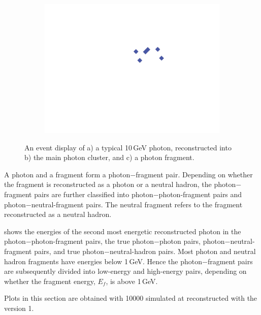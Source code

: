 \begin{figure}[tbph]
\begin{subfigure}[c]{0.3\textwidth}
    \includegraphics[width=\textwidth]{photon/small2}
    \caption{}
    \label{fig:photonEvtDspPhotonFragSmall}
  \end{subfigure}
\caption
{An event display of a) a typical 10\,GeV photon, reconstructed into  b) the main photon cluster,  and c) a photon fragment. }
\label{fig:photonEvtDspPhotonFrag}
\end{figure}




A photon and a fragment form a photon$-$fragment pair.  Depending on whether the fragment is reconstructed as a photon or a neutral hadron, the photon$-$fragment pairs are further classified into photon$-$photon-fragment pairs and photon$-$neutral-fragment pairs. The neutral fragment refers to the fragment reconstructed as a neutral hadron.

 shows the energies of the second most energetic reconstructed photon in the photon$-$photon-fragment pairs, the true photon$-$photon pairs, photon$-$neutral-fragment pairs, and true photon$-$neutral-hadron pairs. Most photon and neutral hadron fragments have energies below 1\,GeV. Hence the photon$-$fragment pairs are subsequently  divided into low-energy and high-energy pairs, depending on whether the fragment energy, $E_f$, is above 1\,GeV.

Plots in this section are obtained with 10000 simulated \eeZuds at  reconstructed with the \pandora version 1.


